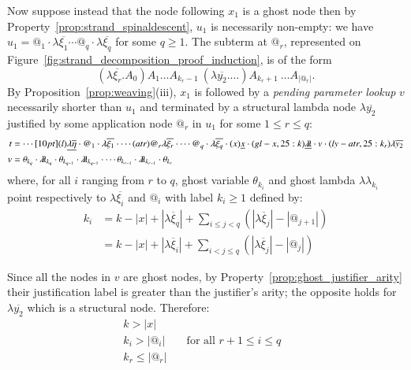 \documentclass{elsarticle}
\theoremstyle{plain}
\theoremstyle{definition}
\theoremstyle{remark}
\newcommand{\ghostlmd}{{\lambda\!\!\lambda}}
\newcommand{\ghostvar}{\theta}
\begin{document}
\begin{enumerate}
Now suppose instead that the node following $x_1$ is a ghost node then by Property~\ref{prop:strand_spinaldescent}, $u_1$ is necessarily non-empty: we have $u_1 =
@_1 \cdot\lambda\overline{\xi_1} \cdots @_q\cdot \lambda\overline{\xi_q}$ for some $q\geq 1$. The subterm at $@_r$,  represented on Figure~\ref{fig:strand_decomposition_proof_induction}, is of the form
$$(\lambda\overline{\xi_r}. A_0) A_1 \ldots A_{k_{r}-1}\ (\lambda\overline{y_2}. \ldots)A_{k_{r}+1}\ \ldots A_{|@_r|} .$$
By Proposition~\ref{prop:weaving}(iii), $x_1$ is followed by a \emph{pending parameter lookup} $v$ necessarily shorter than $u_1$ and terminated by a structural lambda node $\lambda\overline{y_2}$ justified by some application node $@_r$ in $u_1$ for some $1\leq r \leq q$:
\begin{align*}
 t &= \cdots \Pstr[10pt]{
(l){\underline{\lambda\overline{\eta}}} \cdot
{@_1} \cdot \lambda\overline{\xi_1} \cdot
\cdots
(atr){@_r} \lambda\overline{\xi_r} \cdot
\cdots
{@_q} \cdot\lambda\overline{\xi_q} \cdot
(x){\underline{x}}\cdot
(gl-x,25:k){\underline\ghostlmd}
\cdot v
\cdot
(ly-atr,25:k_r){\lambda\overline{y_2}}
 } \\
v &= \ghostvar_{k_q} \cdot \ghostlmd_{k_q} \cdot
\ghostvar_{k_{q-1}} \cdot \ghostlmd_{k_{q-1}} \cdot
\cdots
\ghostvar_{k_{r-1}} \cdot \ghostlmd_{k_{r-1}} \cdot
\ghostvar_{k_{r}}
\end{align*}
where, for all $i$ ranging from $r$ to $q$, ghost variable
$\ghostvar_{k_i}$ and ghost lambda $\ghostlmd_{k_i}$ point respectively to $\lambda\overline{\xi_i}$ and $@_i$ with label $k_i\geq1$ defined by:
\begin{align*}
  k_i &= k - |x| + |\lambda\overline{\xi}_q| + \sum_{i\leq j < q} (|\lambda\overline{\xi}_{j}| - |@_{j+1}|)
\\
   &= k - |x| +
  |\lambda\overline{\xi}_{i}| +
  \sum_{i< j\leq q} (|\lambda\overline{\xi}_j| - |@_j|)
\end{align*}

Since all the nodes in $v$ are ghost nodes, by Property~\ref{prop:ghost_justifier_arity} their justification label is greater than the justifier's arity; the opposite holds for $\lambda\overline{y_2}$ which is a structural node. Therefore:
\begin{align}
k > |x| \label{eqn:k_greater_than_x} \\
k_i > |@_i| & \quad\mbox{for all $r+1\leq i \leq q$ } \label{eqn:qnfdecomp_kj}\\
k_r \leq |@_r|
\end{align}



\end{enumerate}
\end{document}
